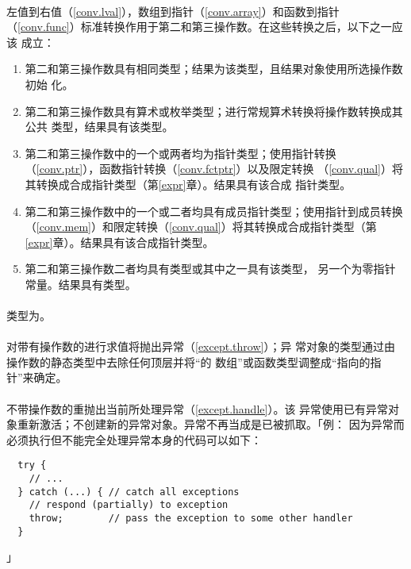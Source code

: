 \paragraph{}
左值到右值（\ref{conv.lval}），数组到指针（\ref{conv.array}）和函数到指针
（\ref{conv.func}）标准转换作用于第二和第三操作数。在这些转换之后，以下之一应该
成立：
\begin{enumerate}
  \item{第二和第三操作数具有相同类型；结果为该类型，且结果对象使用所选操作数初始
    化。}
  \item{第二和第三操作数具有算术或枚举类型；进行常规算术转换将操作数转换成其公共
    类型，结果具有该类型。}
  \item{第二和第三操作数中的一个或两者均为指针类型；使用指针转换
    （\ref{conv.ptr}），函数指针转换（\ref{conv.fctptr}）以及限定转换
    （\ref{conv.qual}）将其转换成合成指针类型（第\ref{expr}章）。结果具有该合成
    指针类型。}
  \item{第二和第三操作数中的一个或二者均具有成员指针类型；使用指针到成员转换 
    （\ref{conv.mem}）和限定转换（\ref{conv.qual}）将其转换成合成指针类型（第
    \ref{expr}章）。结果具有该合成指针类型。}
  \item{第二和第三操作数二者均具有类型或其中之一具有该类型，
    另一个为零指针常量。结果具有类型。}
\end{enumerate}


\paragraph{}
类型为。

\paragraph{}
对带有操作数的进行求值将抛出异常（\ref{except.throw}）；异
常对象的类型通过由操作数的静态类型中去除任何顶层并将``的
数组''或函数类型调整成``指向的指针''来确定。

\paragraph{}
不带操作数的重抛出当前所处理异常（\ref{except.handle}）。该
异常使用已有异常对象重新激活；不创建新的异常对象。异常不再当成是已被抓取。「例：
因为异常而必须执行但不能完全处理异常本身的代码可以如下：
\begin{lstlisting}
  try {
    // ...
  } catch (...) { // catch all exceptions
    // respond (partially) to exception
    throw;        // pass the exception to some other handler
  }
\end{lstlisting}」

